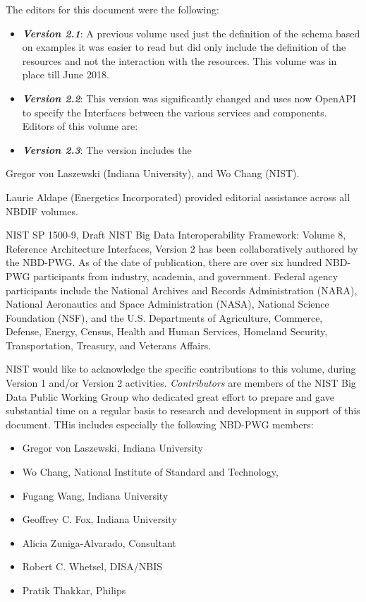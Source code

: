 \documentclass[9pt,]{article}
\providecommand{\tightlist}{%
  \setlength{\itemsep}{0pt}\setlength{\parskip}{0pt}}
\begin{document}
The editors for this document were the following:

\begin{itemize}
\item
  \textbf{\emph{Version 2.1}}: A previous volume used just the
  definition of the schema based on examples it was easier to read but
  did only include the definition of the resources and not the
  interaction with the resources. This volume was in place till June
  2018.
\item
  \textbf{\emph{Version 2.2}}: This version was significantly changed
  and uses now OpenAPI to specify the Interfaces between the various
  services and components. Editors of this volume are:
\item
  \textbf{\emph{Version 2.3}}: The version includes the
\end{itemize}

Gregor von Laszewski (Indiana University), and Wo Chang (NIST).

Laurie Aldape (Energetics Incorporated) provided editorial assistance
across all NBDIF volumes.

NIST SP 1500-9, Draft NIST Big Data Interoperability Framework: Volume
8, Reference Architecture Interfaces, Version 2 has been collaboratively
authored by the NBD-PWG. As of the date of publication, there are over
six hundred NBD-PWG participants from industry, academia, and
government. Federal agency participants include the National Archives
and Records Administration (NARA), National Aeronautics and Space
Administration (NASA), National Science Foundation (NSF), and the U.S.
Departments of Agriculture, Commerce, Defense, Energy, Census, Health
and Human Services, Homeland Security, Transportation, Treasury, and
Veterans Affairs.

NIST would like to acknowledge the specific contributions to this
volume, during Version 1 and/or Version 2 activities.
\emph{Contributors} are members of the NIST Big Data Public Working
Group who dedicated great effort to prepare and gave substantial time on
a regular basis to research and development in support of this document.
THis includes especially the following NBD-PWG members:

\begin{itemize}
\tightlist
\item
  Gregor von\textbar{} Laszewski, Indiana University
\item
  Wo Chang, National Institute of Standard and Technology,
\item
  Fugang Wang, Indiana University
\item
  Geoffrey C. Fox, Indiana University
\item
  Alicia Zuniga-Alvarado, Consultant
\item
  Robert C. Whetsel, DISA/NBIS
\item
  Pratik Thakkar, Philips
\end{itemize}
\end{document}
